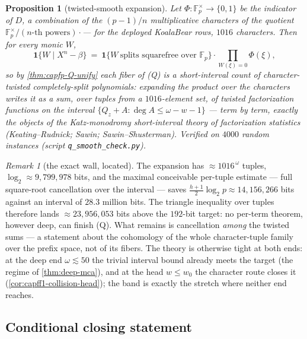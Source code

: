 \documentclass[11pt]{article}
\newtheorem{proposition}[proposition]{Proposition}
\theoremstyle{definition}
\theoremstyle{remark}
\newtheorem{remark}[remark]{Remark}
\newcommand{\F}{\mathbb{F}}
\begin{document}
\begin{proposition}[twisted-smooth expansion]\label{prop:capfp-Q-smooth}
Let $\Phi:\F_p^\times\to\{0,1\}$ be the indicator of $D$, a combination of the $(p-1)/n$ multiplicative characters of the quotient $\F_p^\times/(\text{$n$-th powers})\cdot$--- for the deployed KoalaBear rows, $1016$ characters.  Then for every monic $W$,
\[
        \mathbf1\{W\mid X^n-\beta\}\ =\ \mathbf1\{W\ \text{splits squarefree over }\F_p\}\cdot\prod_{W(\xi)=0}\Phi(\xi),
\]
so by \cref{thm:capfp-Q-unify} each fiber of \textup{(Q)} is a short-interval count of character-twisted completely-split polynomials: expanding the product over the characters writes it as a sum, over tuples from a $1016$-element set, of twisted factorization functions on the interval $\{Q_z+A:\deg A\le\omega-w-1\}$ --- term by term, exactly the objects of the Katz-monodromy short-interval theory of factorization statistics \textup(Keating--Rudnick; Sawin; Sawin--Shusterman\textup).  Verified on $4000$ random instances \textup(script \texttt{q\_smooth\_check.py}\textup).
\end{proposition}

\begin{remark}[the exact wall, located]\label{rem:capfp-Q-wall}
The expansion has $\approx1016^{\,\omega}$ tuples, $\log_2\approx9{,}799{,}978$ bits, and the maximal conceivable per-tuple estimate --- full square-root cancellation over the interval --- saves $\tfrac{h+1}2\log_2p\approx14{,}156{,}266$ bits against an interval of $28.3$ million bits.  The triangle inequality over tuples therefore lands $\approx23{,}956{,}053$ bits above the $192$-bit target: no per-term theorem, however deep, can finish \textup{(Q)}.  What remains is cancellation \emph{among} the twisted sums --- a statement about the cohomology of the whole character-tuple family over the prefix space, not of its fibers.  The theory is otherwise tight at both ends: at the deep end $\omega\lesssim50$ the trivial interval bound already meets the target \textup(the regime of \cref{thm:deep-mca}\textup), and at the head $w\le w_0$ the character route closes it \textup(\cref{cor:capff1-collision-head}\textup); the band is exactly the stretch where neither end reaches.
\end{remark}

\subsection{Conditional closing statement}
\end{document}
